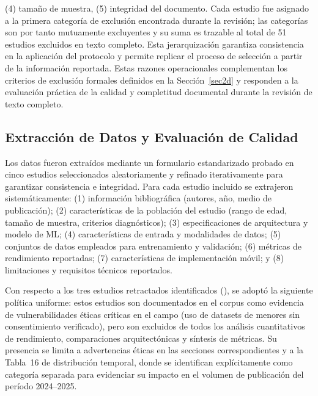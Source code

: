 \documentclass[ASNA,twocolumn]{USG}
\begin{document}
\begin{table}[!ht]
\begin{tablenotes}
			(4) tamaño de muestra, (5) integridad del documento. Cada estudio fue asignado a
			la primera categoría de exclusión encontrada durante la revisión; las categorías
			son por tanto mutuamente excluyentes y su suma es trazable al total de 51 estudios
			excluidos en texto completo. Esta jerarquización garantiza consistencia en la
			aplicación del protocolo y permite replicar el proceso de selección a partir de
			la información reportada. Estas razones operacionales complementan los criterios de exclusión formales definidos en la Sección~\ref{sec2d} y responden a la evaluación práctica de la calidad y completitud documental durante la revisión de texto completo.
		\end{tablenotes}
	\end{table}
	
	\subsection{Extracción de Datos y Evaluación de Calidad}\label{sec2f}
	
	Los datos fueron extraídos mediante un formulario estandarizado probado en cinco
	estudios seleccionados aleatoriamente y refinado iterativamente para garantizar
	consistencia e integridad. Para cada estudio incluido se extrajeron
	sistemáticamente: (1) información bibliográfica (autores, año, medio de
	publicación); (2) características de la población del estudio (rango de edad,
	tamaño de muestra, criterios diagnósticos); (3) especificaciones de arquitectura
	y modelo de ML; (4) características de entrada y modalidades de datos; (5)
	conjuntos de datos empleados para entrenamiento y validación; (6) métricas de
	rendimiento reportadas; (7) características de implementación móvil; y (8)
	limitaciones y requisitos técnicos reportados.
	
	Con respecto a los tres estudios retractados identificados
	(\cite{Gungor2025,Mahmood2025,Kumar2024}), se adoptó la siguiente política uniforme:
	estos estudios son documentados en el corpus como evidencia de vulnerabilidades
	éticas críticas en el campo (uso de datasets de menores sin consentimiento
	verificado), pero son excluidos de todos los análisis cuantitativos de rendimiento,
	comparaciones arquitectónicas y síntesis de métricas. Su presencia se limita a
	advertencias éticas en las secciones correspondientes y a la Tabla~16 de
	distribución temporal, donde se identifican explícitamente como categoría separada
	para evidenciar su impacto en el volumen de publicación del período 2024--2025.
	
\end{document}
